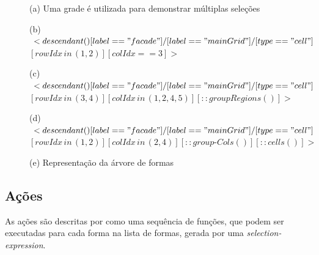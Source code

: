 \begin{description}
    \item[] \; (a) Uma grade é utilizada para demonstrar múltiplas seleções
    \item[] \; (b) $<descendant()[label=="facade"]/[label=="mainGrid"]/[type=="cell"]$ \\
    \qquad \qquad \qquad $[rowIdx \, in \, (1,2)][colIdx==3]>$ 
    \item[] \; (c) $<descendant()[label=="facade"]/[label=="mainGrid"]/[type=="cell"]$ \\
    \qquad \qquad \qquad $[rowIdx \, in \, (3,4)][colIdx \, in \, (1,2,4,5)][::groupRegions()]>$
    \item[] \; (d) $<descendant()[label=="facade"]/[label=="mainGrid"]/[type=="cell"]$ \\
    \qquad \qquad \qquad $[rowIdx \, in \, (1,2)][colIdx \, in \, (2,4)][::group\mbox{-}Cols()][::cells()]>$
    \item[] \; (e) Representação da árvore de formas
\end{description}

\vspace{0.5cm}

\begin{figure}[h!]
	\centering
	\captionsetup{width=15cm}
	{}	
\end{figure}

\subsection{Ações}
\label{sec:selex_acoes}

As ações são descritas por  como uma sequência de funções, que podem ser executadas para cada forma na lista de formas, gerada por uma \textit{selection-expression}.

